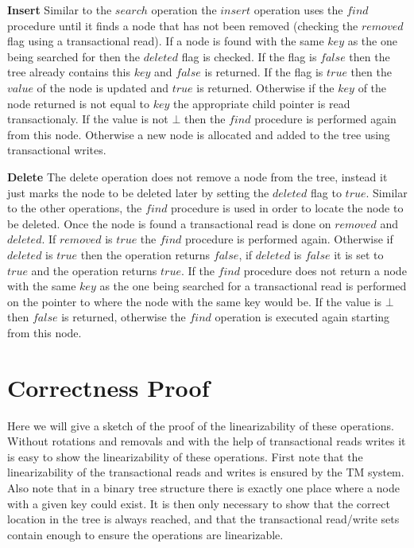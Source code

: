\documentclass[10pt]{sigplanconf}
\begin{document}
{\bf Insert} Similar to the $search$ operation the $insert$ operation uses the $find$ procedure until it finds a node that has not been removed (checking the $removed$ flag using a transactional read).
If a node is found with the same $key$ as the one being searched for then the $deleted$ flag is checked.
If the flag is $false$ then the tree already contains this $key$ and $false$ is returned.
If the flag is $true$ then the $value$ of the node is updated and $true$ is returned.
Otherwise if the $key$ of the node returned is not equal to $key$ the appropriate child pointer is read transactionaly.
If the value is not $\bot$ then the $find$ procedure is performed again from this node.
Otherwise a new node is allocated and added to the tree using transactional writes.

{\bf Delete} The delete operation does not remove a node from the tree, instead it just marks the node to be deleted later by setting the $deleted$ flag to $true$.
Similar to the other operations, the $find$ procedure is used in order to locate the node to be deleted.
Once the node is found a transactional read is done on $removed$ and $deleted$.
If $removed$ is $true$ the $find$ procedure is performed again.
Otherwise if $deleted$ is $true$ then the operation returns $false$, if $deleted$ is $false$ it is set to $true$ and the operation returns $true$.
If the $find$ procedure does not return a node with the same $key$ as the one being searched for a transactional read is performed on the pointer to where the node with the same key would be.
If the value is $\bot$ then $false$ is returned, otherwise the $find$ operation is executed again starting from this node.


\section{Correctness Proof}

Here we will give a sketch of the proof of the linearizability of these operations.
Without rotations and removals and with the help of transactional reads writes it is easy to show the linearizability of these operations.
First note that the linearizability of the transactional reads and writes is ensured by the TM system.
Also note that in a binary tree structure there is exactly one place where a node with a given key could exist.
It is then only necessary to show that the correct location in the tree is always reached, and that the transactional read/write sets contain enough to ensure the operations are linearizable.
\end{document}
